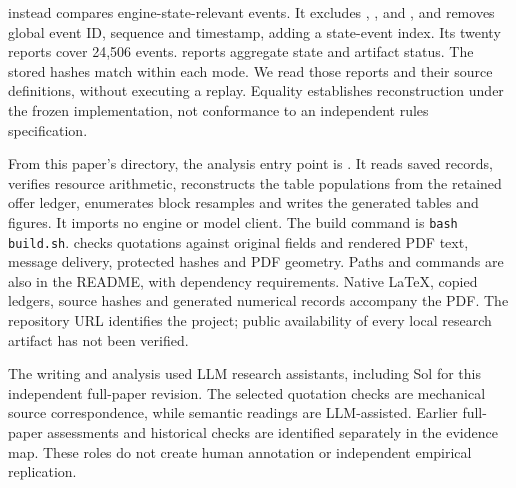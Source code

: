  instead compares engine-state-relevant events. It excludes , ,  and , and removes global event ID, sequence and timestamp, adding a state-event index. Its twenty reports cover 24,506 events.  reports aggregate state and artifact status. The stored hashes match within each mode. We read those reports and their source definitions, without executing a replay. Equality establishes reconstruction under the frozen implementation, not conformance to an independent rules specification.

From this paper's directory, the analysis entry point is . It reads saved records, verifies resource arithmetic, reconstructs the table populations from the retained offer ledger, enumerates block resamples and writes the generated tables and figures. It imports no engine or model client. The build command is \texttt{bash build.sh}.  checks quotations against original fields and rendered PDF text, message delivery, protected hashes and PDF geometry. Paths and commands are also in the README, with dependency requirements. Native LaTeX, copied ledgers, source hashes and generated numerical records accompany the PDF. The repository URL identifies the project; public availability of every local research artifact has not been verified.

The writing and analysis used LLM research assistants, including Sol for this independent full-paper revision. The selected quotation checks are mechanical source correspondence, while semantic readings are LLM-assisted. Earlier full-paper assessments and historical checks are identified separately in the evidence map. These roles do not create human annotation or independent empirical replication.
